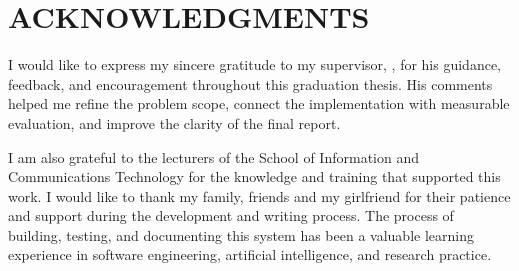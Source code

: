 \chapter*{ACKNOWLEDGMENTS}
I would like to express my sincere gratitude to my supervisor, \supervisorname, for his guidance, feedback, and encouragement throughout this graduation thesis. His comments helped me refine the problem scope, connect the implementation with measurable evaluation, and improve the clarity of the final report.

I am also grateful to the lecturers of the School of Information and Communications Technology for the knowledge and training that supported this work. I would like to thank my family, friends and my girlfriend for their patience and support during the development and writing process. The process of building, testing, and documenting this system has been a valuable learning experience in software engineering, artificial intelligence, and research practice.

\clearpage
